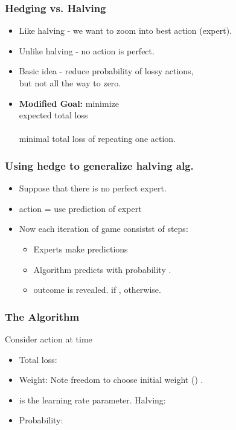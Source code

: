 \documentclass[handout]{beamer}
\begin{document}
\begin{frame}
\frametitle{Hedging vs. Halving}
\begin{itemize}
\item Like halving - we want to zoom into best action (expert).
\item Unlike halving - no action is perfect.
\item Basic idea - reduce probability of lossy actions, \\
but {\color{blue}not all the way to zero}.
\item {\bf Modified Goal:}
minimize {\color{blue}{difference between}} \\
expected total loss \\
{\color{blue}{and}} \\
minimal total loss of repeating one action.
\R{\[
\sum_{t=1}^T \distvec{t} \cdot \costvec{t} - \min_i \left(\sum_{t=1}^T \cost{t}{i} \right)
\]}
\end{itemize}
\end{frame}

\begin{frame}
\frametitle{Using hedge to generalize halving alg.}
\begin{itemize}
\item Suppose that there is no perfect expert.
\item action  = use prediction of expert 
\item Now each iteration of game consistst of  steps:
\begin{itemize}
\item Experts make predictions 
\item Algorithm predicts  with probability .
\item outcome  is revealed.  if ,  otherwise.
\end{itemize}
\end{itemize}
\end{frame}

\begin{frame}
\frametitle{The \ouralg Algorithm}
Consider action  at time 
\begin{itemize}
\item Total loss:
\item Weight:
Note freedom to choose initial weight ()
.
\item
{} is the learning rate parameter. Halving: \R{$\eta \to \infty$}
\item Probability:
\end{itemize}
\end{frame}
\end{document}

